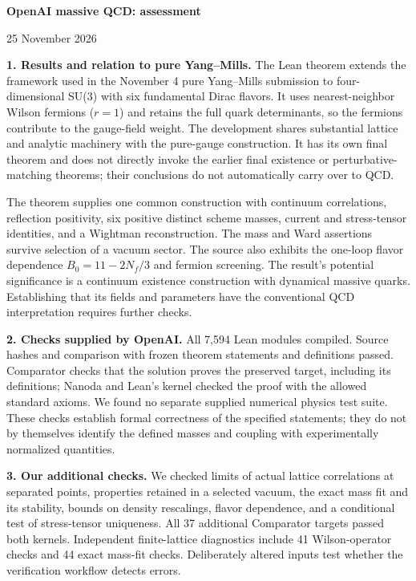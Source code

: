 \documentclass[11pt]{article}
\begin{document}
\begin{center}
{\Large\bfseries OpenAI massive QCD: assessment}\par
\vspace{3pt}
25 November 2026
\end{center}
\vspace{-4pt}

\textbf{1. Results and relation to pure Yang--Mills.}
The Lean theorem extends the framework used in the November 4 pure
Yang--Mills submission to four-dimensional SU(3) with six fundamental Dirac
flavors. It uses nearest-neighbor Wilson fermions ($r=1$) and retains the
full quark determinants, so the fermions contribute to the gauge-field
weight. The development shares substantial lattice and analytic machinery
with the pure-gauge construction. It has its own final theorem and does
not directly invoke the earlier final existence or perturbative-matching
theorems; their conclusions do not automatically carry over to QCD.

The theorem supplies one common construction with continuum correlations,
reflection positivity, six positive distinct scheme masses, current and
stress-tensor identities, and a Wightman reconstruction. The mass and Ward
assertions survive selection of a vacuum sector. The source also exhibits
the one-loop flavor dependence $B_0=11-2N_f/3$ and fermion screening.
The result's potential significance is a continuum existence construction
with dynamical massive quarks. Establishing that its fields and parameters
have the conventional QCD interpretation requires further checks.

\textbf{2. Checks supplied by OpenAI.}
All 7,594 Lean modules compiled. Source hashes and comparison with frozen
theorem statements and definitions passed. Comparator checks that the
solution proves the preserved target, including its definitions; Nanoda
and Lean's kernel checked the proof with the allowed standard axioms.
We found no separate supplied numerical physics test suite.
These checks establish formal correctness of the specified statements;
they do not by themselves identify the defined masses and coupling with
experimentally normalized quantities.

\textbf{3. Our additional checks.}
We checked limits of actual lattice correlations at separated points,
properties retained in a selected vacuum, the exact mass fit and its
stability, bounds on density rescalings, flavor dependence, and a
conditional test of stress-tensor uniqueness. All 37 additional Comparator
targets passed both kernels. Independent finite-lattice diagnostics include
41 Wilson-operator checks and 44 exact mass-fit checks. Deliberately altered
inputs test whether the verification workflow detects errors.
\end{document}
